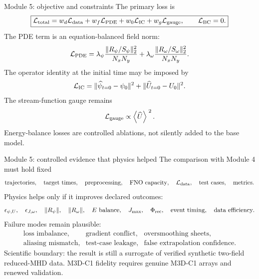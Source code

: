 \documentclass[aspectratio=169,11pt]{beamer}
\newcommand{\avg}[1]{\left\langle #1\right\rangle}
\newcommand{\Rpsi}{R_{\psi}}
\newcommand{\Romega}{R_{\omega}}
\newcommand{\currentmodule}{Module 1}
\newcommand{\moduleprogress}{1 of 4}
\newcommand{\setmodule}[2]{%
  \renewcommand{\currentmodule}{#1}%
  \renewcommand{\moduleprogress}{#2}%
}
\begin{document}
\setmodule{Module 5}{3 of 4}
\begin{frame}[t]{Module 5: objective and constraints}
\vspace{-0.15em}
The primary loss is
\[
\boxed{\mathcal L_{\rm total}=w_d\mathcal L_{\rm data}
+w_f\mathcal L_{\rm PDE}+w_0\mathcal L_{\rm IC}+w_g\mathcal L_{\rm gauge},
\qquad \mathcal L_{\rm BC}=0.}
\]
The PDE term is an equation-balanced field norm:
\[
\mathcal L_{\rm PDE}=\lambda_\psi\frac{\|\Rpsi/S_\psi\|_2^2}{N_xN_y}
+\lambda_\omega\frac{\|\Romega/S_\omega\|_2^2}{N_xN_y}.
\]
The operator identity at the initial time may be imposed by
\[
\mathcal L_{\rm IC}=\|\widehat\psi_{t=0}-\psi_0\|^2+\|\widehat U_{t=0}-U_0\|^2.
\]
The stream-function gauge remains
\[
\mathcal L_{\rm gauge}\propto \avg{\widehat U}^{\;2}.
\]
Energy-balance losses are controlled ablations, not silently added to the base model.
\end{frame}

\setmodule{Module 5}{4 of 4}
\begin{frame}[t]{Module 5: controlled evidence that physics helped}
\vspace{-0.15em}
The comparison with Module 4 must hold fixed
\[
\text{trajectories},\quad \text{target times},\quad \text{preprocessing},\quad
\text{FNO capacity},\quad \mathcal L_{\rm data},\quad \text{test cases},\quad \text{metrics}.
\]
Physics helps only if it improves declared outcomes:
\[
\epsilon_{\psi,U},\quad \epsilon_{J,\omega},\quad \|\Rpsi\|,
\quad \|\Romega\|,
\quad E\text{ balance},\quad J_{\max},\quad \Phi_{\rm rec},\quad \text{event timing},\quad \text{data efficiency}.
\]
Failure modes remain plausible:
\[
\begin{array}{lll}
\text{loss imbalance}, & \text{gradient conflict}, & \text{oversmoothing sheets},\\
\text{aliasing mismatch}, & \text{test-case leakage}, & \text{false extrapolation confidence}.
\end{array}
\]
Scientific boundary: the result is still a surrogate of verified synthetic two-field reduced-MHD data. M3D-C1 fidelity requires genuine M3D-C1 arrays and renewed validation.
\end{frame}
\end{document}
